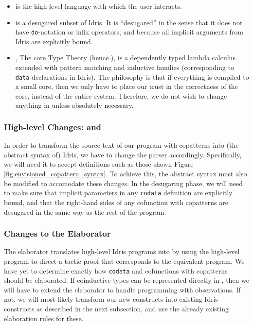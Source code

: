 \begin{itemize}
\item \Idris{} is the high-level language with which the user interacts.
\item \IdrisM{} %
is a desugared subset of Idris. It is ``desugared'' in the sense that it does not have \texttt{do}-notation or infix operators, and because all implicit arguments from Idris are explicitly bound.
\item \TT, The core Type Theory (hence \TT), is a dependently typed lambda calculus extended with pattern matching and inductive families (corresponding to \texttt{data} declarations in Idris). The philosophy is that if everything is compiled to a small core, then we only have to place our trust in the correctness of the core, instead of the entire system. Therefore, we do not wish to change anything in \TT{} unless absolutely necessary.
\end{itemize}

\subsubsection{High-level Changes: \Idris{} and \IdrisM{}}
In order to transform the source text of our program with copatterns into (the abstract syntax of) Idris, we have to change the parser accordingly. Specifically, we will need it to accept definitions such as those shown Figure \ref{fig:envisioned_copattern_syntax}. To achieve this, the abstract syntax must also be modified to accomodate these changes. In the desugaring phase, we will need to make sure that implicit parameters in any \texttt{codata} definition are explicitly bound, and that the right-hand sides of any cofunction with copatterns are desugared in the same way as the rest of the program.

\subsubsection{Changes to the Elaborator}
The elaborator translates high-level Idris programs into \TT{} by using the high-level program to direct a tactic proof that corresponds to the equivalent \TT{} program. We have yet to determine exactly how \texttt{codata} and cofunctions with copatterns should be elaborated. If coinductive types can be represented directly in \TT, then we will have to extend the elaborator to handle programming with observations. If not, we will most likely transform our new constructs into existing Idris constructs as described in the next subsection, and use the already existing elaboration rules for these.


